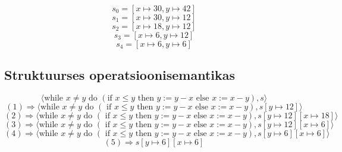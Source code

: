\documentclass[a4paper,oneside]{article}
\begin{document}
\[s_0 = [x \mapsto 30, y \mapsto 42]\]
\[s_1 = [x \mapsto 30, y \mapsto 12]\]
\[s_2 = [x \mapsto 18, y \mapsto 12]\]
\[s_3 = [x \mapsto 6, y \mapsto 12]\]
\[s_4 = [x \mapsto 6, y \mapsto 6]\]

\subsection{Struktuurses operatsioonisemantikas}

\[
  \langle
  \text{while } x \neq y \text{ do }
  (\text{if } x \leq y
    \text{ then } y := y-x
    \text{ else } x := x-y), s
  \rangle
\]
\[
  (1) \Rightarrow
  \langle
  \text{while } x \neq y \text{ do }
  (\text{ if } x \leq y
    \text{ then } y := y-x
    \text{ else } x := x-y),
    s[y \mapsto 12]
  \rangle
\]
\[
  (2) \Rightarrow
  \langle
  \text{while } x \neq y \text{ do }
  (\text{ if } x \leq y
    \text{ then } y := y-x
    \text{ else } x := x-y),
    s[y \mapsto 12][x \mapsto 18]
  \rangle
\]
\[
  (3) \Rightarrow
  \langle
  \text{while } x \neq y \text{ do }
  (\text{ if } x \leq y
    \text{ then } y := y-x
    \text{ else } x := x-y),
    s[y \mapsto 12][x \mapsto 6]
  \rangle
\]
\[
  (4) \Rightarrow
  \langle
  \text{while } x \neq y \text{ do }
  (\text{ if } x \leq y
    \text{ then } y := y-x
    \text{ else } x := x-y),
    s[y \mapsto 6][x \mapsto 6]
  \rangle
\]
\[
  (5) \Rightarrow
  s[y \mapsto 6][x \mapsto 6]
\]
\end{document}
